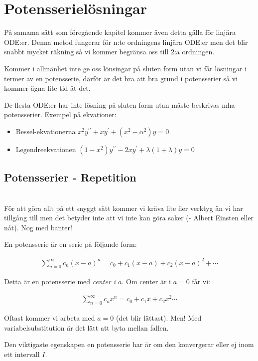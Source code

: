 \section{Potensserielösningar}
\noindent På samama sätt som föregående kapitel kommer även detta gälla för linjära ODE:er. Denna metod fungerar för n:te ordningens linjära ODE:er men det blir snabbt mycket räkning så vi kommer begränsa oss till 2:a ordningen. 
\par\bigskip
\noindent Kommer i allmänhet inte ge oss lönsingar på sluten form utan vi får lösningar i termer av en potensserie, därför är det bra att bra grund i potensserier så vi kommer ägna lite tid åt det. 
\par\bigskip
\noindent De flesta ODE:er har inte lösning på sluten form utan måste beskrivas mha potensserier. Exempel på ekvationer:
\par\bigskip
\begin{itemize}
  \item Bessel-ekvationerna $x^2y^{\prime\prime}+xy^{\prime}+(x^2-\alpha^2)y=0$
  \item Legendreekvationen $(1-x^2)y^{\prime\prime}-2xy^{\prime}+\lambda(1+\lambda)y=0$
\end{itemize}
\par\bigskip
\subsection{Potensserier - Repetition}\hfill\\

\noindent För att göra allt på ett snyggt sätt kommer vi kräva lite fler verktyg än vi har tillgång till men det betyder inte att vi inte kan göra saker (- Albert Einsten eller nåt). Nog med banter!
\par\bigskip
\noindent En potensserie är en serie på följande form:

\begin{equation*}
  \begin{gathered}
    \sum_{n=0}^{\infty}c_n(x-a)^n = c_0+c_1(x-a)+c_2(x-a)^2+\cdots
  \end{gathered}
\end{equation*}
\par\bigskip
\noindent Detta är en potensserie med \textit{center i $a$}. Om center är i $a=0$ får vi:


\begin{equation*}
  \begin{gathered}
    \sum_{n=0}^{\infty}c_nx^n = c_0 + c_1x+c_2x^2\cdots
  \end{gathered}
\end{equation*}
\par\bigskip
\noindent Oftast kommer vi arbeta med $a = 0$ (det blir lättast). Men! Med variabelsubstitution är det lätt att byta mellan fallen.
\par\bigskip
\noindent Den viktigaste egenskapen en potensserie har är om den konvergerar eller ej inom ett intervall $I$.
\par\bigskip

